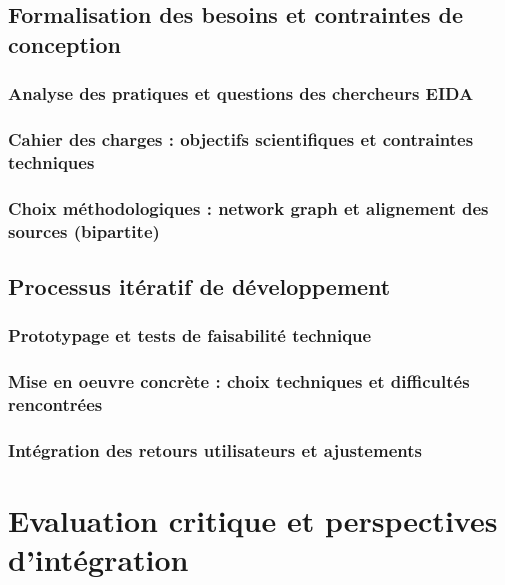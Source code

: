 \documentclass[a4paper,12pt,twoside]{book}
\newcommand{\clearemptydoublepage}{\newpage{\pagestyle{empty}\cleardoublepage}}
\begin{document}
	\clearemptydoublepage
	
	\chapter{Formalisation des besoins et contraintes de conception}
	\section{Analyse des pratiques et questions des chercheurs EIDA}
	
	
	\section{Cahier des charges : objectifs scientifiques et contraintes techniques}
	
	
	\section{Choix méthodologiques : network graph et alignement des sources (bipartite)}
	
	
	\clearemptydoublepage
	
	\chapter{Processus itératif de développement}
	\section{Prototypage et tests de faisabilité technique}
	
	
	\section{Mise en oeuvre concrète : choix techniques et difficultés rencontrées}
	
	
	\section{Intégration des retours utilisateurs et ajustements}
	
	
	\clearemptydoublepage
	
	\part{Evaluation critique et perspectives d'intégration}
\end{document}
